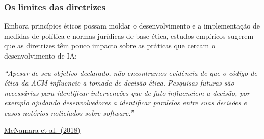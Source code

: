 \documentclass[
  11pt,
]{article}
\renewenvironment{quote}
  {\begin{tcolorbox}[
      breakable, enhanced jigsaw, rounded corners,
      arc=3pt, boxrule=0pt, frame hidden,
      colback=iaCaso,
      borderline west={3pt}{0pt}{iaRiscos},
      left=12pt, right=10pt, top=9pt, bottom=9pt,
      before skip=9pt, after skip=9pt]}
  {\end{tcolorbox}}
\begin{document}
\subsubsection{Os limites das
diretrizes}\label{os-limites-das-diretrizes}

Embora princípios éticos possam moldar o desenvolvimento e a
implementação de medidas de política e normas jurídicas de base ética,
estudos empíricos sugerem que as diretrizes têm pouco impacto sobre as
práticas que cercam o desenvolvimento de IA:

\begin{quote}
\emph{``Apesar de seu objetivo declarado, não encontramos evidência de
que o código de ética da ACM influencie a tomada de decisão ética.
Pesquisas futuras são necessárias para identificar intervenções que de
fato influenciem a decisão, por exemplo ajudando desenvolvedores a
identificar paralelos entre suas decisões e casos notórios noticiados
sobre software.''}

\href{https://dl-acm-org.libproxy.helsinki.fi/doi/10.1145/3236024.3264833}{McNamara
et al.~(2018)}
\end{quote}
\end{document}
